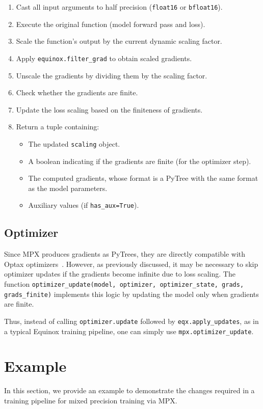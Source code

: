 \documentclass[logo]{dsme}
\newcommand{\mpx}{\textsc{MPX}}
\begin{document}
\begin{enumerate}
    \item Cast all input arguments to half precision (\texttt{float16} or \texttt{bfloat16}).
    \item Execute the original function (model forward pass and loss).
    \item Scale the function's output by the current dynamic scaling factor.
    \item Apply \texttt{equinox.filter\_grad} to obtain scaled gradients.
    \item Unscale the gradients by dividing them by the scaling factor.
    \item Check whether the gradients are finite.
    \item Update the loss scaling based on the finiteness of gradients.
    \item Return a tuple containing:
    \begin{itemize}
        \item The updated \texttt{scaling} object.
        \item A boolean indicating if the gradients are finite (for the optimizer step).
        \item The computed gradients, whose format is a PyTree with the same format as the model parameters.
        \item Auxiliary values (if \texttt{has\_aux=True}).
    \end{itemize}
\end{enumerate}



\subsection{Optimizer}
\label{sec:optimizer}

Since \mpx{} produces gradients as PyTrees, they are directly compatible with Optax optimizers~\citep{deepmind2020jax}.
However, as previously discussed, it may be necessary to skip optimizer updates if the gradients become infinite due to loss scaling. 
The function \texttt{optimizer\_update(model, optimizer, optimizer\_state, grads, grads\_finite)} implements this logic by updating the model only when gradients are finite.

Thus, instead of calling \texttt{optimizer.update} followed by \texttt{eqx.apply\_updates}, as in a typical Equinox training pipeline, one can simply use \texttt{mpx.optimizer\_update}.


\section{Example}
In this section, we provide an example to demonstrate the changes required in a training pipeline for mixed precision training via \mpx{}.
\end{document}
